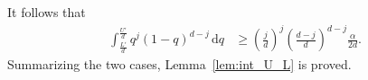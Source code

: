 \documentclass[onecolumn,letterpaper]{IEEEtran}
\newcommand{\cp}{{q}}
\newcommand{\up}{{U}}
\newcommand{\lw}{{L}}
\newcommand*{\dif}{{\,\mathrm{d}}}
\newcommand{\ap}{{\alpha}}
\begin{document}
\begin{IEEEproof}
\begin{itemize}
\end{itemize}
It follows that 
\begin{align*}
\int_{\frac {\lw'}{d}}^{\frac {\up'}{d}} \cp^j (1-\cp)^{d-j} \dif \cp %
&\ge \left( \frac{j}{d} \right)^j \left( \frac{d-j}{d} \right)^{d-j} \frac{\ap}{2d}.
\end{align*}
Summarizing the two cases, Lemma~\ref{lem:int_U_L} is proved. 
\end{IEEEproof}
\end{document}
